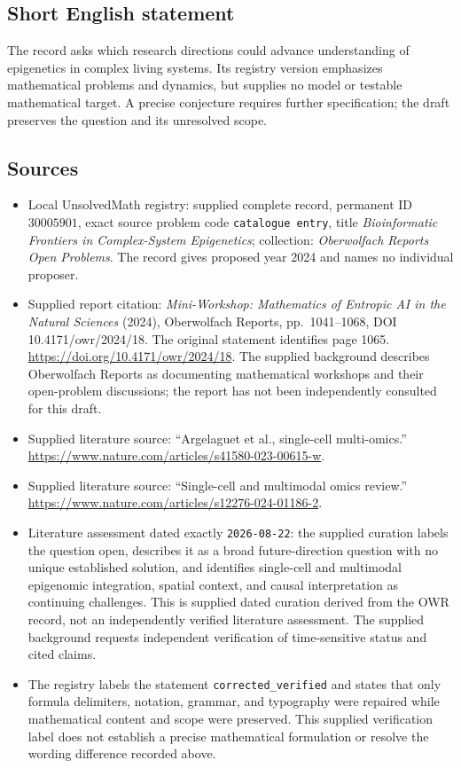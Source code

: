 \documentclass[11pt]{article}
\begin{document}
\subsection{Short English statement}
The record asks which research directions could advance understanding of epigenetics in complex living systems. Its registry version emphasizes mathematical problems and dynamics, but supplies no model or testable mathematical target. A precise conjecture requires further specification; the draft preserves the question and its unresolved scope.
\subsection{Sources}
\begin{itemize}
\item Local UnsolvedMath registry: supplied complete record, permanent ID \(30005901\), exact source problem code \texttt{catalogue entry}, title \emph{Bioinformatic Frontiers in Complex-System Epigenetics}; collection: \emph{Oberwolfach Reports Open Problems}. The record gives proposed year 2024 and names no individual proposer.
\item Supplied report citation: \emph{Mini-Workshop: Mathematics of Entropic AI in the Natural Sciences} (2024), Oberwolfach Reports, pp.\ 1041--1068, DOI 10.4171/owr/2024/18. The original statement identifies page 1065. \url{https://doi.org/10.4171/owr/2024/18}. The supplied background describes Oberwolfach Reports as documenting mathematical workshops and their open-problem discussions; the report has not been independently consulted for this draft.
\item Supplied literature source: ``Argelaguet et al., single-cell multi-omics.'' \url{https://www.nature.com/articles/s41580-023-00615-w}.
\item Supplied literature source: ``Single-cell and multimodal omics review.'' \url{https://www.nature.com/articles/s12276-024-01186-2}.
\item Literature assessment dated exactly \texttt{2026-08-22}: the supplied curation labels the question open, describes it as a broad future-direction question with no unique established solution, and identifies single-cell and multimodal epigenomic integration, spatial context, and causal interpretation as continuing challenges. This is supplied dated curation derived from the OWR record, not an independently verified literature assessment. The supplied background requests independent verification of time-sensitive status and cited claims.
\item The registry labels the statement \texttt{corrected\_verified} and states that only formula delimiters, notation, grammar, and typography were repaired while mathematical content and scope were preserved. This supplied verification label does not establish a precise mathematical formulation or resolve the wording difference recorded above.
\end{itemize}
\end{document}
